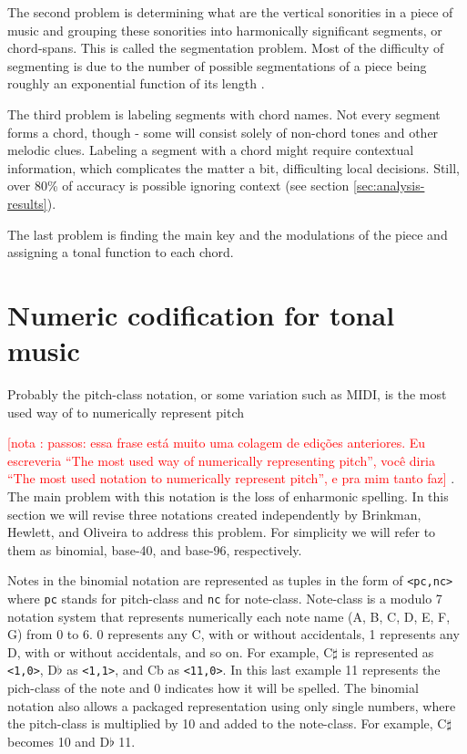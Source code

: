 \documentclass{article}
\newcounter{notacounter}
\newcommand{\nota}[1]{
  \addtocounter{notacounter}{1}
  \textcolor{red}{[nota \arabic{notacounter}: #1]}
}
\begin{document}
The second problem is determining what are the vertical sonorities in
a piece of music and grouping these sonorities into harmonically
significant segments, or chord-spans. This is called the segmentation
problem. Most of the difficulty of segmenting is due to the number of
possible segmentations of a piece being roughly an exponential
function of its length \cite{pardo02:algorithms}.

The third problem is labeling segments with chord names. Not every
segment forms a chord, though - some will consist solely of non-chord
tones and other melodic clues. Labeling a segment with a chord might
require contextual information, which complicates the matter a bit,
difficulting local decisions. Still, over 80\% of accuracy is possible
ignoring context (see section \ref{sec:analysis-results}).

The last problem is finding the main key and the modulations of the
piece and assigning a tonal function to each chord.

\section{Numeric codification for tonal music}
\label{sec:codificacao-jamary}

Probably the pitch-class notation, or some variation such as MIDI, is
the most used way of to numerically represent pitch \nota{ passos:
  essa frase está muito uma colagem de edições anteriores. Eu
  escreveria ``The most used way of numerically representing pitch'',
  você diria ``The most used notation to numerically represent
  pitch'', e pra mim tanto faz}. The main problem
with this notation is the loss of enharmonic spelling. In this section
we will revise three notations created independently by Brinkman,
Hewlett, and Oliveira \cite{brinkman86:_binom_repres_of_pitch_for,
  hewlett92:base40, oliveira01:codificacao} to address this problem.
For simplicity we will refer to them as binomial, base-40, and
base-96, respectively.

Notes in the binomial notation are represented as tuples in the form
of \texttt{<pc,nc>} where \texttt{pc} stands for pitch-class and
\texttt{nc} for note-class. Note-class is a modulo 7 notation system
that represents numerically each note name (A, B, C, D, E, F, G) from
0 to 6. 0 represents any C, with or without accidentals, 1 represents
any D, with or without accidentals, and so on. For example, C$\sharp$
is represented as \texttt{<1,0>}, D$\flat$ as \texttt{<1,1>}, and Cb
as \texttt{<11,0>}. In this last example 11 represents the pich-class of the
note and 0 indicates how it will be spelled. The binomial notation
also allows a packaged representation using only single numbers, where
the pitch-class is multiplied by 10 and added to the note-class. For
example, C$\sharp$ becomes 10 and D$\flat$ 11.
\end{document}
